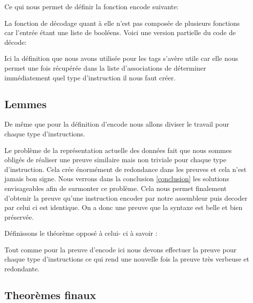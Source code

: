 \documentclass {article}
\newcommand{\codefrom}[3]
           {}
\theoremstyle{definition}
\theoremstyle{remark}
\begin{document}
\codefrom{src}{encode}{encode_t_n}

Ce qui nous permet de définir la fonction encode suivante:

\codefrom{src}{encode}{encode}

La fonction de décodage quant à elle n'est pas composée de plusieurs fonctions car l'entrée
étant une liste de booléens.
Voici une version partielle du code de décode:

\codefrom{src}{encode}{decode}

Ici la définition que nous avons utilisée pour les tags s'avère utile car elle nous permet
une fois récupérée dans la liste d'associations de déterminer immédiatement quel type
d'instruction il nous faut créer.





\subsection{Lemmes}
\label{LemmesEncode}
De même que pour la définition d'encode nous allons diviser le travail pour chaque
type d'instructions.

\codefrom{src}{encodeProof}{encode_decode_t_n}

Le problème de la représentation actuelle des données fait que nous sommes obligés de réaliser une preuve
similaire mais non triviale pour chaque type d'instruction. Cela crée énormément de redondance dans les preuves
et cela n'est jamais bon signe. Nous verrons dans la conclusion \ref{conclusion} les solutions envisageables afin
de surmonter ce problème.
Cela nous permet finalement d'obtenir la preuve qu'une instruction encoder par notre assembleur puis decoder par celui
ci est identique. On a donc une preuve que la syntaxe est belle et bien préservée.

Définissons le théorème opposé à celui- ci à savoir :

\codefrom{src}{decodeProof}{decode_encode}

Tout comme pour la preuve d'encode ici nous devons effectuer la preuve pour chaque type d'instructions
ce qui rend une nouvelle fois la preuve très verbeuse et redondante. 




\subsection{Theorèmes finaux}
\end{document}
